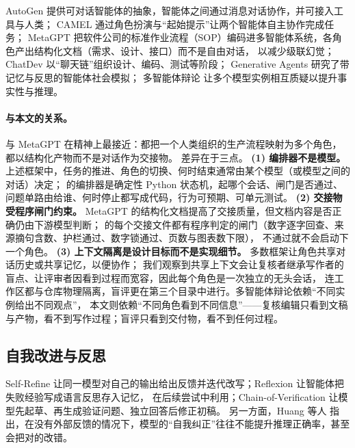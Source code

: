 AutoGen\cite{wu2023autogen} 提供可对话智能体的抽象，智能体之间通过消息对话协作，并可接入工具与人类；
CAMEL\cite{li2023camel} 通过角色扮演与“起始提示”让两个智能体自主协作完成任务；
MetaGPT\cite{hong2024metagpt} 把软件公司的标准作业流程（SOP）编码进多智能体系统，各角色产出结构化文档（需求、设计、接口）而不是自由对话，
以减少级联幻觉；ChatDev\cite{qian2024chatdev} 以“聊天链”组织设计、编码、测试等阶段；
Generative Agents\cite{park2023generative} 研究了带记忆与反思的智能体社会模拟；
多智能体辩论\cite{du2024debate} 让多个模型实例相互质疑以提升事实性与推理。

\paragraph{与本文的关系。}
\sysname{} 与 MetaGPT 在精神上最接近：都把一个人类组织的生产流程映射为多个角色，都以结构化产物而不是对话作为交接物。
差异在于三点。
\textbf{(1) 编排器不是模型。} 上述框架中，任务的推进、角色的切换、何时结束通常由某个模型（或模型之间的对话）决定；
\sysname{} 的编排器是确定性 Python 状态机，起哪个会话、闸门是否通过、问题单路由给谁、何时停止都写成代码，行为可预期、可单元测试。
\textbf{(2) 交接物受程序闸门约束。} MetaGPT 的结构化文档提高了交接质量，但文档内容是否正确仍由下游模型判断；
\sysname{} 的每个交接文件都有程序判定的闸门（数字逐字回查、来源摘句含数、护栏通过、数字锁通过、页数与图表数下限），
不通过就不会启动下一个角色。
\textbf{(3) 上下文隔离是设计目标而不是实现细节。} 多数框架让角色共享对话历史或共享记忆，以便协作；
我们观察到共享上下文会让复核者继承写作者的盲点、让评审者因看到过程而宽容，因此每个角色是一次独立的无头会话，
连工作区都与仓库物理隔离，盲评更在第三个目录中进行。多智能体辩论依赖“不同实例给出不同观点”，
本文则依赖“不同角色看到不同信息”——复核编辑只看到文稿与产物，看不到写作过程；盲评只看到交付物，看不到任何过程。

\subsection{自我改进与反思}
\label{sec:rel-refine}

Self-Refine\cite{madaan2023selfrefine} 让同一模型对自己的输出给出反馈并迭代改写；Reflexion\cite{shinn2023reflexion} 让智能体把失败经验写成语言反思存入记忆，
在后续尝试中利用；Chain-of-Verification\cite{dhuliawala2024cove} 让模型先起草、再生成验证问题、独立回答后修正初稿。
另一方面，Huang 等人\cite{huang2024cannot} 指出，在没有外部反馈的情况下，模型的“自我纠正”往往不能提升推理正确率，甚至会把对的改错。

